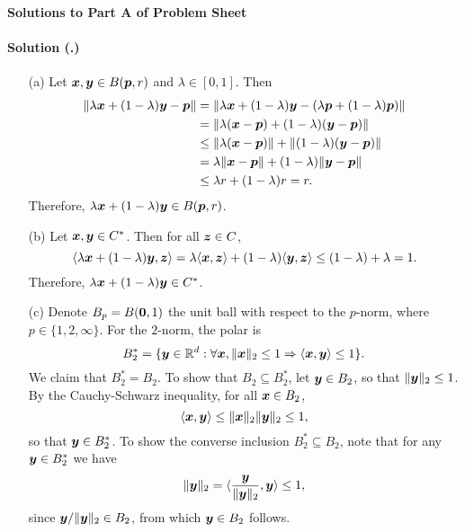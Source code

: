 \documentclass{article}
\newcounter{problemSheetNumber}
\newcounter{problems}
\renewcommand{\solution}[1]{\paragraph{Solution (\theproblemSheetNumber.\theproblems)}\addtocounter{problems}{1}\label{#1}}
\begin{document}
 
\begin{center}
{\Large {\bf Solutions to Part A of Problem Sheet \theproblemSheetNumber}}
\end{center}

\solution{pr:4} 
\begin{itemize}
 \item[(a)] Let $\bm{x},\bm{y}\in B(\bm{p},r)$ and $\lambda\in [0,1]$. Then
 \begin{align*}
  \Vert {\lambda \bm{x}+(1-\lambda)\bm{y}-\bm{p}}\Vert &= \Vert {\lambda \bm{x}+(1-\lambda)\bm{y}-(\lambda \bm{p}+(1-\lambda)\bm{p})}\Vert\\
  &= \Vert {\lambda (\bm{x}-\bm{p})+(1-\lambda)(\bm{y}-\bm{p})}\Vert\\
  &\leq \Vert {\lambda (\bm{x}-\bm{p})}\Vert+\Vert {(1-\lambda)(\bm{y}-\bm{p})}\Vert\\
  &=\lambda\Vert {\bm{x}-\bm{p}}\Vert+(1-\lambda)\Vert {\bm{y}-\bm{p}}\Vert\\
  &\leq \lambda r+(1-\lambda)r = r.
 \end{align*}
Therefore, $\lambda \bm{x}+(1-\lambda)\bm{y}\in B(\bm{p},r)$.
\item[(b)] Let $\bm{x},\bm{y}\in C^*$. Then for all $\bm{z}\in C$,
\begin{equation*}
 \langle {\lambda \bm{x}+(1-\lambda)\bm{y}}, {\bm{z}} \rangle = \lambda\langle { \bm{x}}, {\bm{z}} \rangle+(1-\lambda)\langle {\bm{y}}, {\bm{z}} \rangle\leq (1-\lambda)+\lambda = 1.
\end{equation*}
Therefore, $\lambda \bm{x}+(1-\lambda)\bm{y}\in C^*$.
\item[(c)] Denote $B_p=B(\bm{0},1)$ the unit ball with respect to the $p$-norm, where $p\in \{1,2,\infty\}$. For the $2$-norm, the polar is
\begin{equation*}
 B_2^* = \{\bm{y}\in \mathbb{R}^d \mathrel{\mathop{:}} \forall \bm{x}, \Vert {\bm{x}}\Vert_2\leq 1\Rightarrow \langle {\bm{x}}, {\bm{y}} \rangle\leq 1\}.
\end{equation*}
We claim that $B_2^* = B_2$. To show that $B_2\subseteq B_2^*$, let $\bm{y}\in B_2$, so that $\Vert {\bm{y}}\Vert_2\leq 1$. 
By the Cauchy-Schwarz inequality, for all $\bm{x}\in B_2$, 
\begin{equation*}
 \langle {\bm{x}}, {\bm{y}} \rangle\leq \Vert {\bm{x}}\Vert_2\Vert {\bm{y}}\Vert_2\leq 1,
\end{equation*}
so that $\bm{y}\in B_2^*$. To show the converse inclusion $B_2^*\subseteq B_2$, note that for any $\bm{y}\in B_2^*$ we have
\begin{equation*}
 \Vert {\bm{y}}\Vert_2 = \langle {\frac{\bm{y}}{\Vert {\bm{y}}\Vert_2}}, {\bm{y}} \rangle\leq 1,
\end{equation*}
since $\bm{y}/\Vert {\bm{y}}\Vert_2\in B_2$, from which $\bm{y}\in B_2$ follows. 


\end{itemize}
\end{document}
